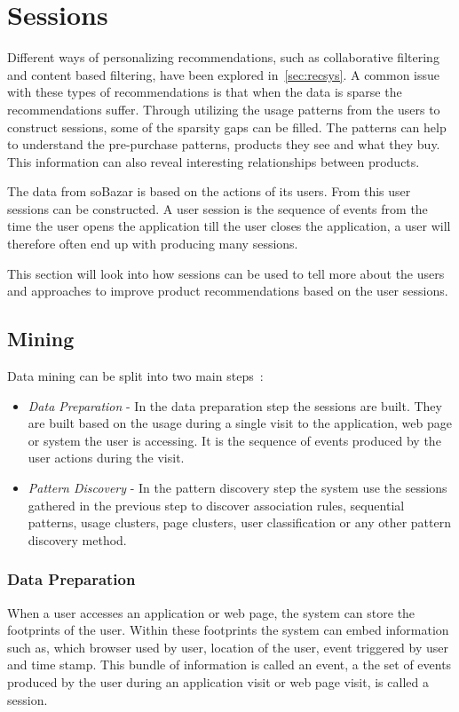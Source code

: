 
\section{Sessions}
    Different ways of personalizing recommendations, such as collaborative filtering and content based filtering, have been explored in~\ref{sec:recsys}.
    A common issue with these types of recommendations is that when the data is sparse the recommendations suffer.
    Through utilizing the usage patterns from the users to construct sessions, some of the sparsity gaps can be filled.
    The patterns can help to understand the pre-purchase patterns, products they see and what they buy.
    This information can also reveal interesting relationships between products.

    The data from soBazar is based on the actions of its users.
    From this user sessions can be constructed.
    A user session is the sequence of events from the time the user opens the application till the user closes the application, a user will therefore often end up with producing many sessions.

    This section will look into how sessions can be used to tell more about the users and approaches to improve product recommendations based on the user sessions.

\subsection{Mining}
    Data mining can be split into two main steps~\cite{Cho2002329}:
    \begin{itemize}
        \item \emph{Data Preparation} - In the data preparation step the sessions are built. They are built based on the usage during a single visit to the application, web page or system the user is accessing. It is the sequence of events produced by the user actions during the visit.
        \item \emph{Pattern Discovery} - In the pattern discovery step the system use the sessions gathered in the previous step to discover association rules, sequential patterns, usage clusters, page clusters, user classification or any other pattern discovery method.
    \end{itemize}

\subsubsection{Data Preparation} %
    \label{par:Data_Preparation}
    When a user accesses an application or web page, the system can store the footprints of the user.
    Within these footprints the system can embed information such as, which browser used by user, location of the user, event triggered by user and time stamp.
    This bundle of information is called an event, a the set of events produced by the user during an application visit or web page visit, is called a session.

